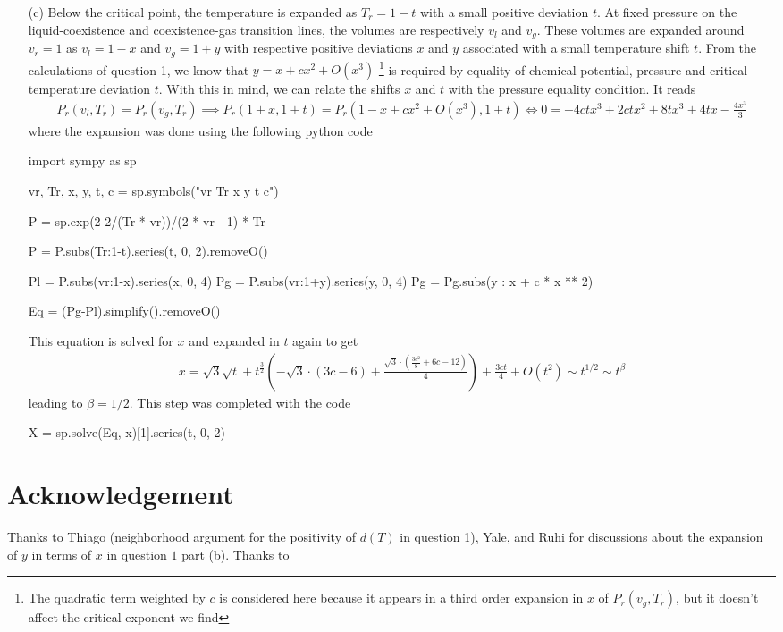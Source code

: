 \documentclass[10pt, a4paper]{article}
\begin{document}
{\begin{enumerate}
  \item[(c)] Below the critical point, the temperature is expanded as $T_r = 1 - t$ with a small positive deviation $t$. At fixed pressure on the liquid-coexistence and coexistence-gas transition lines, the volumes are respectively $v_l$ and $v_g$. These volumes are expanded around $v_r = 1$ as $v_l = 1 - x$ and $v_g = 1 + y$ with respective positive deviations $x$ and $y$ associated with a small temperature shift $t$. From the calculations of question 1, we know that $y = x + c x^2 + O(x^3)$ \footnote{The quadratic term weighted by $c$ is considered here because it appears in a third order expansion in $x$ of $P_r(v_g, T_r)$, but it doesn't affect the critical exponent we find} is required by equality of chemical potential, pressure and critical temperature deviation $t$. With this in mind, we can relate the shifts $x$ and $t$ with the pressure equality condition. It reads  
  \begin{align*}
    P_r(v_l, T_r) = P_r(v_g, T_r) \implies  P_r(1+x, 1+t) = P_r(1-x + cx^2 + O(x^3), 1+t)
    \iff 0 = - 4 c t x^{3} + 2 c t x^{2} + 8 t x^{3} + 4 t x - \frac{4 x^{3}}{3}
  \end{align*} 
where the expansion was done using the following python code
\begin{python}
import sympy as sp 

vr, Tr, x, y, t, c = sp.symbols("vr Tr x y t c")

P = sp.exp(2-2/(Tr * vr))/(2 * vr - 1) * Tr

P = P.subs({Tr:1-t}).series(t, 0, 2).removeO()

Pl = P.subs({vr:1-x}).series(x, 0, 4) 
Pg = P.subs({vr:1+y}).series(y, 0, 4) 
Pg = Pg.subs({y : x + c * x ** 2})

Eq = (Pg-Pl).simplify().removeO()
\end{python}
This equation is solved for $x$ and expanded in $t$ again to get 
\begin{align*}
  x = \sqrt{3} \sqrt{t} + t^{\frac{3}{2}} \left(- \sqrt{3} \cdot \left(3 c - 6\right) + \frac{\sqrt{3} \cdot \left(\frac{3 c^{2}}{8} + 6 c - 12\right)}{4}\right) + \frac{3 c t}{4} + O\left(t^{2}\right) \sim t^{1/2} \sim t^{\beta}
\end{align*}
leading to $\beta = 1/2$. This step was completed with the code 
\begin{python}
  X = sp.solve(Eq, x)[1].series(t, 0, 2)
\end{python}
\end{enumerate}






\section{Acknowledgement}
Thanks to Thiago (neighborhood argument for the positivity of $d(T)$ in question 1), Yale, and Ruhi for discussions about the expansion of $y$ in terms of $x$ in question $1$ part (b). Thanks to  
}

\makereferences


\end{document}
